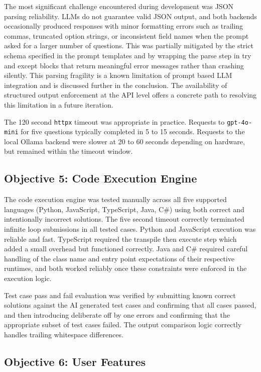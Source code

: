 The most significant challenge encountered during development was
JSON parsing reliability. LLMs do not guarantee valid JSON output,
and both backends occasionally produced responses with minor
formatting errors such as trailing commas, truncated option strings,
or inconsistent field names when the prompt asked for a larger number
of questions. This was partially mitigated by the strict schema
specified in the prompt templates and by wrapping the parse step in
try and except blocks that return meaningful error messages rather
than crashing silently. This parsing fragility is a known limitation
of prompt based LLM integration \cite{liu2023promptsurvey} and is
discussed further in the conclusion. The availability of structured
output enforcement at the API level \cite{openai2024structured}
offers a concrete path to resolving this limitation in a future
iteration.

The 120 second \texttt{httpx} timeout was appropriate in practice.
Requests to \texttt{gpt-4o-mini} for five questions typically
completed in 5 to 15 seconds. Requests to the local Ollama backend
were slower at 20 to 60 seconds depending on hardware, but remained
within the timeout window.

\subsection{Objective 5: Code Execution Engine}

The code execution engine was tested manually across all five
supported languages (Python, JavaScript, TypeScript, Java, C\#) using
both correct and intentionally incorrect solutions. The five second
timeout correctly terminated infinite loop submissions in all tested
cases. Python and JavaScript execution was reliable and fast.
TypeScript required the transpile then execute step which added a
small overhead but functioned correctly. Java and C\# required careful
handling of the class name and entry point expectations of their
respective runtimes, and both worked reliably once these constraints
were enforced in the execution logic.

Test case pass and fail evaluation was verified by submitting known
correct solutions against the AI generated test cases and confirming
that all cases passed, and then introducing deliberate off by one
errors and confirming that the appropriate subset of test cases
failed. The output comparison logic correctly handles trailing
whitespace differences.

\subsection{Objective 6: User Features}

